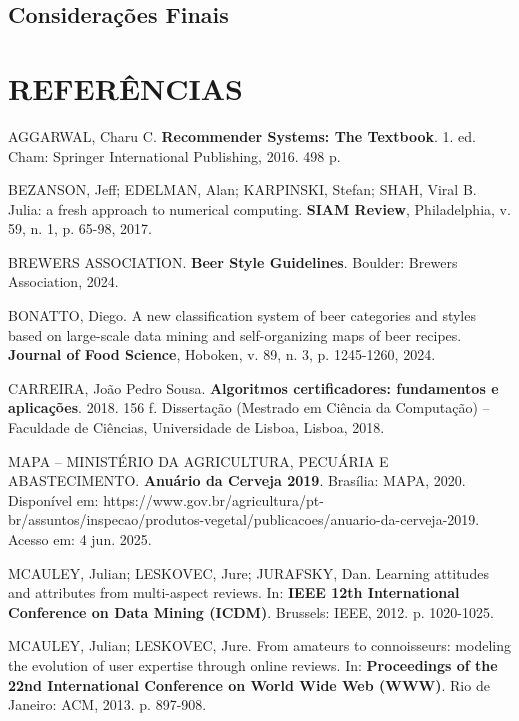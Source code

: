 \documentclass[12pt,a4paper]{article}
\begin{document}
\subsection{Considerações Finais}

\newpage
\section{REFERÊNCIAS}

\begin{thebibliography}{20}

AGGARWAL, Charu C. \textbf{Recommender Systems: The Textbook}. 1. ed. Cham: Springer International Publishing, 2016. 498 p.

BEZANSON, Jeff; EDELMAN, Alan; KARPINSKI, Stefan; SHAH, Viral B. Julia: a fresh approach to numerical computing. \textbf{SIAM Review}, Philadelphia, v. 59, n. 1, p. 65-98, 2017.

BREWERS ASSOCIATION. \textbf{Beer Style Guidelines}. Boulder: Brewers Association, 2024.


BONATTO, Diego. A new classification system of beer categories and styles based on large-scale data mining and self-organizing maps of beer recipes. \textbf{Journal of Food Science}, Hoboken, v. 89, n. 3, p. 1245-1260, 2024.

CARREIRA, João Pedro Sousa. \textbf{Algoritmos certificadores: fundamentos e aplicações}. 2018. 156 f. Dissertação (Mestrado em Ciência da Computação) -- Faculdade de Ciências, Universidade de Lisboa, Lisboa, 2018.

MAPA -- MINISTÉRIO DA AGRICULTURA, PECUÁRIA E ABASTECIMENTO. \textbf{Anuário da Cerveja 2019}. Brasília: MAPA, 2020. Disponível em: https://www.gov.br/agricultura/pt-br/assuntos/inspecao/produtos-vegetal/publicacoes/anuario-da-cerveja-2019. Acesso em: 4 jun. 2025.

MCAULEY, Julian; LESKOVEC, Jure; JURAFSKY, Dan. Learning attitudes and attributes from multi-aspect reviews. In: \textbf{IEEE 12th International Conference on Data Mining (ICDM)}. Brussels: IEEE, 2012. p. 1020-1025.

MCAULEY, Julian; LESKOVEC, Jure. From amateurs to connoisseurs: modeling the evolution of user expertise through online reviews. In: \textbf{Proceedings of the 22nd International Conference on World Wide Web (WWW)}. Rio de Janeiro: ACM, 2013. p. 897-908.


\end{thebibliography}
\end{document}
